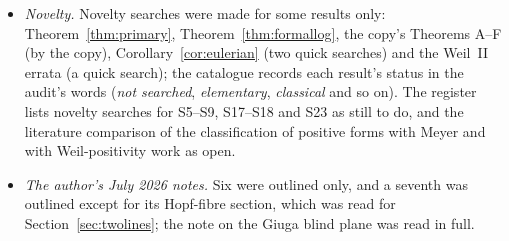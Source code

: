 \begin{itemize}
\item \emph{Novelty.} Novelty searches were made for some results only: Theorem~\ref{thm:primary}, Theorem~\ref{thm:formallog}, the copy's Theorems A--F (by the copy), Corollary~\ref{cor:eulerian} (two quick searches) and the Weil~II errata (a quick search); the catalogue records each result's status in the audit's words (\emph{not searched}, \emph{elementary}, \emph{classical} and so on). The register lists novelty searches for S5--S9, S17--S18 and S23 as still to do, and the literature comparison of the classification of positive forms with Meyer and with Weil-positivity work as open.
\item \emph{The author's July 2026 notes.} Six were outlined only, and a seventh was outlined except for its Hopf-fibre section, which was read for Section~\ref{sec:twolines}; the note on the Giuga blind plane was read in full.
\end{itemize}
